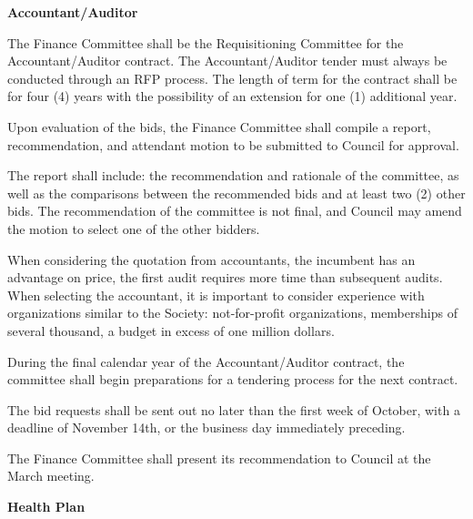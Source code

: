 \begin{longenum}[label*=\thesection.\arabic*., align=left]
\begin{longenum} [label*=\arabic*., align=left]
		\item  \textbf{Accountant/Auditor}
		\begin{longenum} [label*=\arabic*., align=left]
			\item The Finance Committee shall be the Requisitioning Committee for the Accountant/Auditor contract. The Accountant/Auditor tender must always be conducted through an RFP process. The length of term for the contract shall be for four (4) years with the possibility of an extension for one (1) additional year.
			\item Upon evaluation of the bids, the Finance Committee shall compile a report, recommendation, and attendant motion to be submitted to Council for approval.
			\item The report shall include: the recommendation and rationale of the committee, as well as the comparisons between the recommended bids and at least two (2) other bids. The recommendation of the committee is not final, and Council may amend the motion to select one of the other bidders.
			\item When considering the quotation from accountants, the incumbent has an advantage on price, the first audit requires more time than subsequent audits. When selecting the accountant, it is important to consider experience with organizations similar to the Society: not-for-profit organizations, memberships of several thousand, a budget in excess of one million dollars.
			\item During the final calendar year of the Accountant/Auditor contract, the committee shall begin preparations for a tendering process for the next contract.
			\item The bid requests shall be sent out no later than the first week of October, with a deadline of November 14th, or the business day immediately preceding.
			\item The Finance Committee shall present its recommendation to Council at the
March meeting.
\end{longenum}

\item \textbf{Health Plan}


\end{longenum}
\end{longenum}
